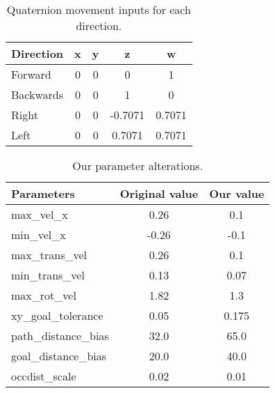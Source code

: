 \documentclass{article}
\begin{document}
\begin{table}[h]
\vskip 3mm
\begin{center}
\begin{small}
\begin{sc}
\begin{tabular}{lcccc}
\hline
\abovespace\belowspace
Direction & x & y & z & w \\
\hline
  Forward & 0 & 0 & 0 & 1\\
  Backwards & 0 & 0 & 1 & 0 \\
  Right & 0 & 0 & -0.7071 & 0.7071 \\
  Left & 0 & 0 & 0.7071 & 0.7071 
\end{tabular}
\end{sc}
\end{small}
\caption{Quaternion movement inputs for each direction.}
\label{tab:quaternions}
\end{center}
\vskip -3mm
\end{table}
\begin{table}[h]
\vskip 3mm
\begin{center}
\begin{small}
\begin{sc}
\begin{tabular}{lcc}
\hline
\abovespace\belowspace
Parameters & Original value & Our value \\
\hline
  max\_vel\_x & 0.26 & 0.1 \\
  min\_vel\_x & -0.26 & -0.1 \\
  max\_trans\_vel & 0.26 & 0.1 \\
  min\_trans\_vel & 0.13 & 0.07 \\
  max\_rot\_vel & 1.82 & 1.3 \\
  xy\_goal\_tolerance & 0.05 & 0.175 \\
  path\_distance\_bias & 32.0 & 65.0 \\
  goal\_distance\_bias & 20.0 & 40.0 \\
  occdist\_scale & 0.02 & 0.01
\end{tabular}
\end{sc}
\end{small}
\caption{Our parameter alterations.}
\label{tab:params}
\end{center}
\vskip -3mm
\end{table}


\end{document}
